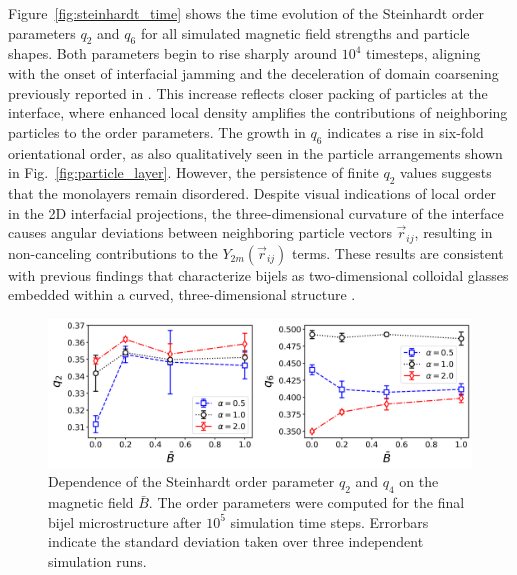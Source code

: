 Figure~\ref{fig:steinhardt_time} shows the time evolution of the Steinhardt order parameters \(q_2\) and \(q_6\) for all simulated magnetic field strengths and particle shapes. Both parameters begin 
to rise sharply around \(10^4\) timesteps, aligning with the onset of interfacial jamming and the deceleration of domain coarsening previously reported in \cite{karthikeyan_formation_2024}. This increase 
reflects closer packing of particles at the interface, where enhanced local density amplifies the contributions of neighboring particles to the order parameters. The growth in \(q_6\) indicates a 
rise in six-fold orientational order, as also qualitatively seen in the particle arrangements shown in Fig.~\ref{fig:particle_layer}. However, the persistence of finite \(q_2\) values suggests that the 
monolayers remain disordered. Despite visual indications of local order in the 2D interfacial projections, the three-dimensional curvature of the interface causes angular deviations between neighboring 
particle vectors \(\vec{r}_{ij}\), resulting in non-canceling contributions to the \(Y_{2m}(\vec{r}_{ij})\) terms. These results are consistent with previous findings that characterize bijels as two-dimensional 
colloidal glasses embedded within a curved, three-dimensional structure \cite{ching_bijel_2022}.

\begin{figure}
\centering
\includegraphics[scale=0.45]{../figures/results/paper1_5/steinhardt_field.png}%
\caption{Dependence of the Steinhardt order parameter $q_2$ and $q_4$ on the magnetic field $\bar{B}$. The order parameters were computed for the final 
         bijel microstructure after $10^5$ simulation time steps. Errorbars indicate the standard deviation taken over three independent simulation runs.
\label{fig:steinhardt_field}}%
\end{figure}

